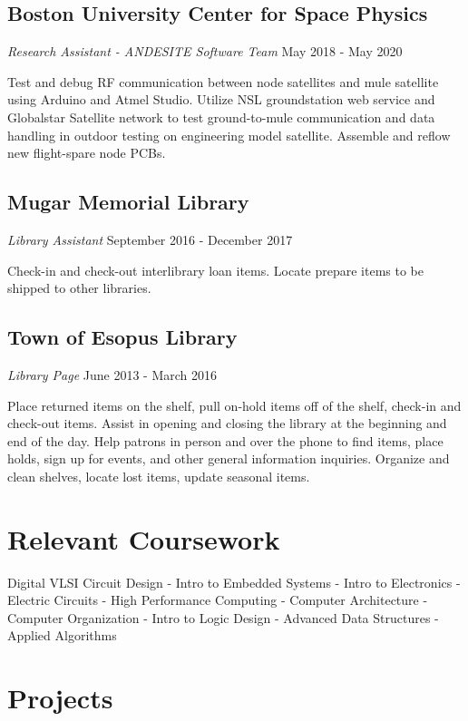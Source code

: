 \documentclass{article}
\begin{document}
\subsection{Boston University Center for Space Physics}  \textit{Research Assistant - ANDESITE Software Team}
  May 2018 - May 2020

Test and debug RF communication between node satellites and mule satellite using Arduino and Atmel Studio. Utilize NSL groundstation web service and Globalstar Satellite network to test ground-to-mule communication and data handling in outdoor testing on engineering model satellite. Assemble and reflow new flight-spare node PCBs.
\vspace{-.75em}
\subsection{Mugar Memorial Library} \textit{Library Assistant}
  September 2016 - December 2017

Check-in and check-out interlibrary loan items. Locate prepare items to be shipped to other libraries.
\vspace{-.75em}
\subsection{Town of Esopus Library} \textit{Library Page}
  June 2013 - March 2016

Place returned items on the shelf, pull on-hold items off of the shelf, check-in and check-out items. Assist in opening and closing the library at the beginning and end of the day. Help patrons in person and over the phone to find items, place holds, sign up for events, and other general information inquiries. Organize and clean shelves, locate lost items, update seasonal items.

\vspace{-.75em}
\section{Relevant Coursework}
{\centering
Digital VLSI Circuit Design - Intro to Embedded Systems - Intro to Electronics - Electric Circuits - High Performance Computing - Computer Architecture - Computer Organization - Intro to Logic Design - Advanced Data Structures - Applied Algorithms
\par
}

\vspace{-.75em}
\section{Projects}
\end{document}
